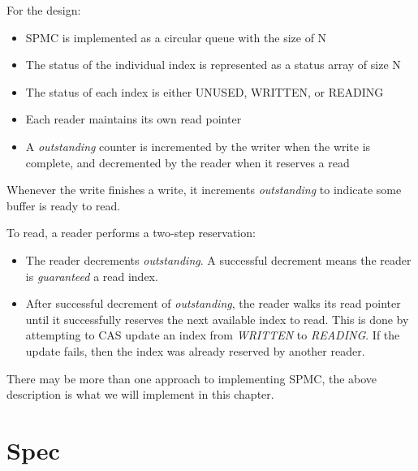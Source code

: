 For the design:
\begin{itemize}
    \item SPMC is implemented as a circular queue with the size of N
    \item The status of the individual index is represented as a status array of size N
    \item The status of each index is either UNUSED, WRITTEN, or READING
    \item Each reader maintains its own read pointer
    \item A \textit{outstanding} counter is incremented by the writer when the write is complete, 
    and decremented by the reader when it reserves a read
\end{itemize}

Whenever the write finishes a write, it increments \textit{outstanding} to
indicate some buffer is ready to read.\newline 

To read, a reader performs a two-step reservation: 
\begin{itemize}
    \item The reader decrements \textit{outstanding}. A successful decrement means
    the reader is \textit{guaranteed} a read index.
    \item After successful decrement of \textit{outstanding}, the reader walks its read pointer until it successfully reserves the next available index to
    read. This is done by attempting to CAS update an index from \textit{WRITTEN} to
    \textit{READING}. If the update fails, then the index was already reserved by another 
    reader.
\end{itemize}

There may be more than one approach to implementing SPMC, the above description
is what we will implement in this chapter.

\section{Spec}

